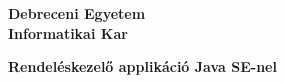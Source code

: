 \begin{titlepage}
	\begin{center}
		\vspace*{1cm}
		
		\textbf{\large{Debreceni Egyetem \\ Informatikai Kar}}
		
		\vfill
		
		\textbf{Rendeléskezelő applikáció Java SE-nel}
		
		\vfill
		
		\begin{parcolumns}[colwidths={1=.4\linewidth}]{2}
		\end{parcolumns}
		
	\end{center}
\end{titlepage}